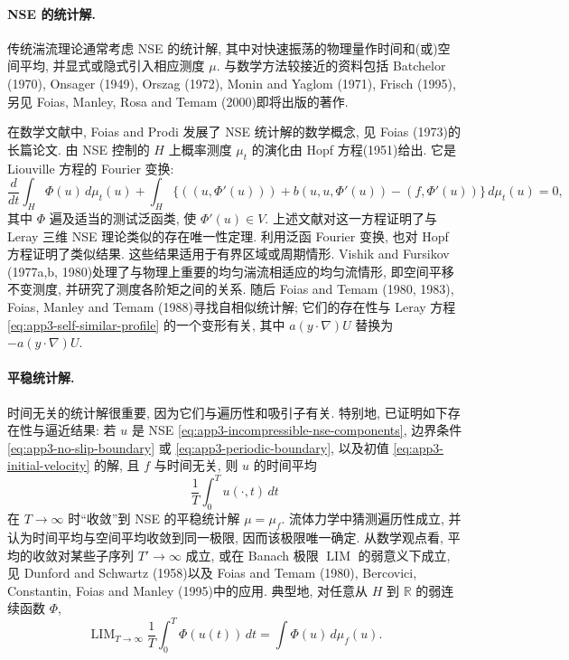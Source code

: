\paragraph{NSE 的统计解.}
传统湍流理论通常考虑 NSE 的统计解, 其中对快速振荡的物理量作时间和(或)空间平均, 并显式或隐式引入相应测度 $\mu$. 与数学方法较接近的资料包括 Batchelor (1970), Onsager (1949), Orszag (1972), Monin and Yaglom (1971), Frisch (1995), 另见 Foias, Manley, Rosa and Temam (2000)即将出版的著作.

在数学文献中, Foias and Prodi 发展了 NSE 统计解的数学概念, 见 Foias (1973)的长篇论文. 由 NSE 控制的 $H$ 上概率测度 $\mu_t$ 的演化由 Hopf 方程(1951)给出. 它是 Liouville 方程的 Fourier 变换:
\[
\frac d{dt}\int_H\Phi(u)\,d\mu_t(u)
+\int_H\{((u,\Phi'(u)))+b(u,u,\Phi'(u))-(f,\Phi'(u))\}\,d\mu_t(u)=0,
\]
其中 $\Phi$ 遍及适当的测试泛函类, 使 $\Phi'(u)\in V$. 上述文献对这一方程证明了与 Leray 三维 NSE 理论类似的存在唯一性定理. 利用泛函 Fourier 变换, 也对 Hopf 方程证明了类似结果. 这些结果适用于有界区域或周期情形. Vishik and Fursikov (1977a,b, 1980)处理了与物理上重要的均匀湍流相适应的均匀流情形, 即空间平移不变测度, 并研究了测度各阶矩之间的关系. 随后 Foias and Temam (1980, 1983), Foias, Manley and Temam (1988)寻找自相似统计解; 它们的存在性与 Leray 方程 
\eqref{eq:app3-self-similar-profile} 的一个变形有关, 其中 $a(y\cdot\nabla)U$ 替换为 $-a(y\cdot\nabla)U$.

\paragraph{平稳统计解.}
时间无关的统计解很重要, 因为它们与遍历性和吸引子有关. 特别地, 已证明如下存在性与逼近结果: 若 $u$ 是 NSE 
\eqref{eq:app3-incompressible-nse-components}, 边界条件 
\eqref{eq:app3-no-slip-boundary} 或 
\eqref{eq:app3-periodic-boundary}, 以及初值 
\eqref{eq:app3-initial-velocity} 的解, 且 $f$ 与时间无关, 则 $u$ 的时间平均
\begin{equation}
\frac1T\int_0^T u(\cdot,t)\,dt
\label{eq:app3-time-average-velocity}
\end{equation}
在 $T\to\infty$ 时``收敛''到 NSE 的平稳统计解 $\mu=\mu_f$. 流体力学中猜测遍历性成立, 并认为时间平均与空间平均收敛到同一极限, 因而该极限唯一确定. 从数学观点看, 平均的收敛对某些子序列 $T'\to\infty$ 成立, 或在 Banach 极限 $\operatorname{LIM}$ 的弱意义下成立, 见 Dunford and Schwartz (1958)以及 Foias and Temam (1980), Bercovici, Constantin, Foias and Manley (1995)中的应用. 典型地, 对任意从 $H$ 到 $\mathbb R$ 的弱连续函数 $\Phi$,
\begin{equation}
\operatorname{LIM}_{T\to\infty}\frac1T\int_0^T\Phi(u(t))\,dt
=\int\Phi(u)\,d\mu_f(u).
\label{eq:app3-banach-limit-statistical-solution}
\end{equation}

